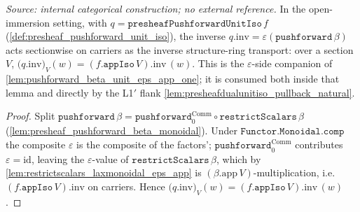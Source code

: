 \begin{lemma}[Carrier-value of the pushforward comparator inverse $q.\mathrm{inv} = \varepsilon$]\leanok
  \label{lem:presheaf_pushforward_unit_iso_inv_app}
  \textit{Source: internal categorical construction; no external reference.}
  In the open-immersion setting, with \(q = \mathtt{presheafPushforwardUnitIso}\,f\)
  (\cref{def:presheaf_pushforward_unit_iso}), the inverse \(q.\mathrm{inv} =
  \varepsilon(\mathtt{pushforward}\,\beta)\) acts sectionwise on carriers as the inverse structure-ring
  transport: over a section \(V\),
  \(\bigl(q.\mathrm{inv}\bigr)_V (w) = (f.\mathtt{appIso}\,V).\mathrm{inv}\,(w)\).
  This is the \(\varepsilon\)-side companion of \cref{lem:pushforward_beta_unit_eps_app_one}; it is
  consumed both inside that lemma and directly by the L1\('\) flank
  \cref{lem:presheafdualunitiso_pullback_natural}.
\end{lemma}
\begin{proof}
  \leanok
  Split \(\mathtt{pushforward}\,\beta = \mathtt{pushforward}_0^{\mathrm{Comm}} \circ
  \mathtt{restrictScalars}\,\beta\) (\cref{lem:presheaf_pushforward_beta_monoidal}). Under
  \(\mathtt{Functor.Monoidal.comp}\) the composite \(\varepsilon\) is the composite of the factors';
  \(\mathtt{pushforward}_0^{\mathrm{Comm}}\) contributes \(\varepsilon = \mathrm{id}\), leaving the
  \(\varepsilon\)-value of \(\mathtt{restrictScalars}\,\beta\), which by
  \cref{lem:restrictscalars_laxmonoidal_eps_app} is \((\beta.\mathrm{app}\,V)\)-multiplication, i.e.
  \((f.\mathtt{appIso}\,V).\mathrm{inv}\) on carriers. Hence
  \(\bigl(q.\mathrm{inv}\bigr)_V (w) = (f.\mathtt{appIso}\,V).\mathrm{inv}\,(w)\).
\end{proof}

